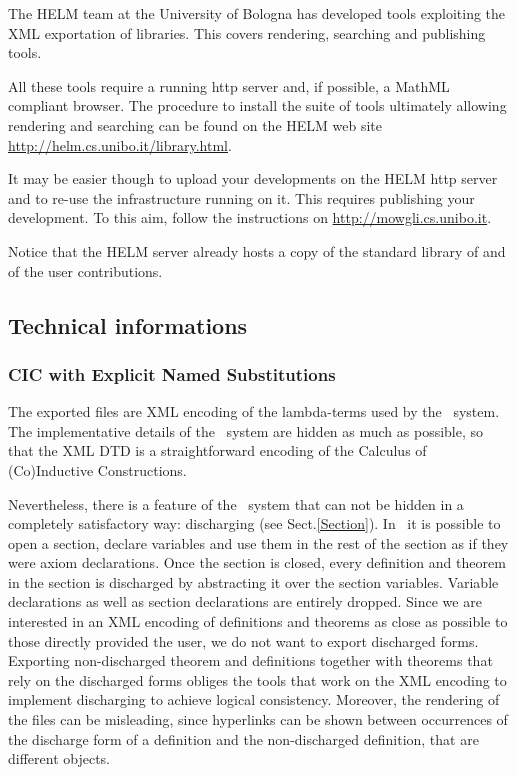 The HELM team at the University of Bologna has developed tools
exploiting the XML exportation of {\Coq} libraries. This covers
rendering, searching and publishing tools.

All these tools require a running http server and, if possible, a
MathML compliant browser.  The procedure to install the suite of tools
ultimately allowing rendering and searching can be found on the HELM
web site \url{http://helm.cs.unibo.it/library.html}.

It may be easier though to upload your developments on the HELM http
server and to re-use the infrastructure running on it. This requires
publishing your development. To this aim, follow the instructions on
\url{http://mowgli.cs.unibo.it}.

Notice that the HELM server already hosts a copy of the standard
library of {\Coq} and of the {\Coq} user contributions.

\subsection{Technical informations}

\subsubsection{CIC with Explicit Named Substitutions}
                                                                               
The exported files are XML encoding of the lambda-terms used by the
\Coq\ system. The implementative details of the \Coq\ system are hidden as much
as possible, so that the XML DTD is a straightforward encoding of the
Calculus of (Co)Inductive Constructions.
                                                                                
Nevertheless, there is a feature of the \Coq\ system that can not be
hidden in a completely satisfactory way: discharging (see Sect.\ref{Section}).
In \Coq\ it is possible
to open a section, declare variables and use them in the rest of the section
as if they were axiom declarations. Once the section is closed, every definition and theorem in the section is discharged by abstracting it over the section
variables. Variable declarations as well as section declarations are entirely
dropped. Since we are interested in an XML encoding of definitions and
theorems as close as possible to those directly provided the user, we
do not want to export discharged forms. Exporting non-discharged theorem
and definitions together with theorems that rely on the discharged forms
obliges the tools that work on the XML encoding to implement discharging to
achieve logical consistency. Moreover, the rendering of the files can be
misleading, since hyperlinks can be shown between occurrences of the discharge
form of a definition and the non-discharged definition, that are different
objects.
                                                                                
